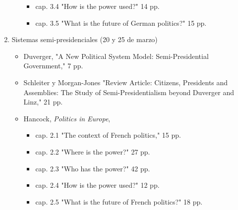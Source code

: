 \documentclass{article}
\begin{document}
\begin{enumerate}
\begin{itemize}
\begin{itemize}
\item cap. 3.4 "How is the power used?" 14 pp.
\item cap. 3.5 "What is the future of German politics?" 15 pp.
\end{itemize}
\end{itemize}
\item Sistemas semi-presidenciales  (20 y 25 de marzo)
\label{sec:orgf863d44}
\begin{itemize}
\item Duverger, "A New Political System Model: Semi-Presidential Government," 7 pp.
\item Schleiter y Morgan-Jones "Review Article: Citizens, Presidents and Assemblies: The Study of Semi-Presidentialism beyond Duverger and Linz," 21 pp.
\item Hancock, \emph{Politics in Europe}, 
\begin{itemize}
\item cap. 2.1 "The context of French politics," 15 pp.
\item cap. 2.2 "Where is the power?" 27 pp.
\item cap. 2.3 "Who has the power?" 42 pp.
\item cap. 2.4 "How is the power used?" 12 pp.
\item cap. 2.5 "What is the future of French politics?" 18 pp.
\end{itemize}
\end{itemize}
\end{enumerate}
\end{document}
